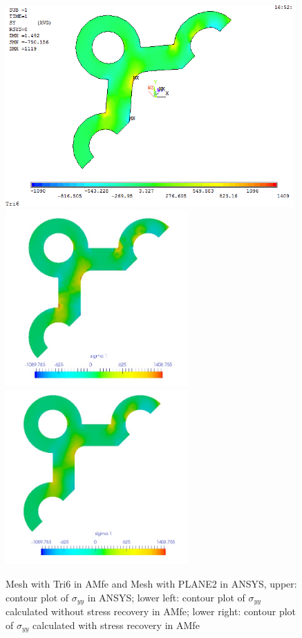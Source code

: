 \begin{figure}[htbp]
	\begin{center}
		\includegraphics[width=11cm,clip]{Tri6_Syy.png} 	
		\includegraphics[width=7cm,clip]{Tri6_Syy_PD.png} 		
		\includegraphics[width=7cm,clip]{Tri6_Syy_P.png} 		
		\caption{Mesh with Tri6 in AMfe and Mesh with PLANE2 in ANSYS, upper: contour plot of $\sigma_{yy}$ in ANSYS; lower left: contour plot of $\sigma_{yy}$ calculated without stress recovery in AMfe; lower right: contour plot of $\sigma_{yy}$ calculated with stress recovery in AMfe} \label{fig: Tri6_Syy}
	\end{center}
\end{figure}
\clearpage 

